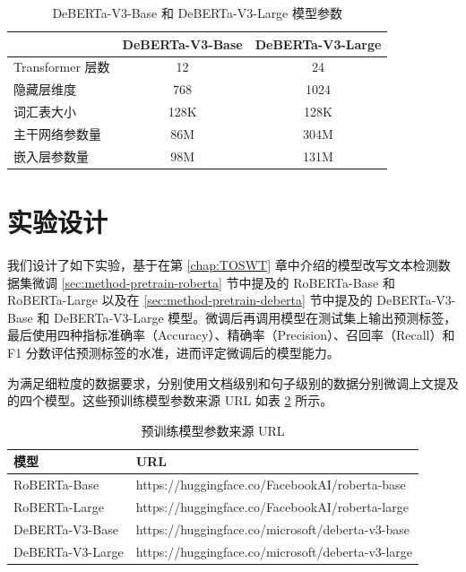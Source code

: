 \begin{table}[htbp]
\centering
\caption{DeBERTa-V3-Base 和 DeBERTa-V3-Large 模型参数} \label{tab:deberta-parameter}
\begin{tabular}{lcc}
\toprule
               & \multicolumn{1}{l}{\textbf{DeBERTa-V3-Base}} & \multicolumn{1}{l}{\textbf{DeBERTa-V3-Large}} \\ \midrule
Transformer 层数 & 12                                           & 24                                            \\
隐藏层维度          & 768                                          & 1024                                          \\
词汇表大小          & 128K                                         & 128K                                          \\
主干网络参数量        & 86M                                          & 304M                                          \\
嵌入层参数量         & 98M                                          & 131M                                \\ \bottomrule         
\end{tabular}
\end{table}

\section{实验设计}
\label{sec:method-experiment}

我们设计了如下实验，基于在第 \ref{chap:TOSWT} 章中介绍的模型改写文本检测数据集微调 \ref{sec:method-pretrain-roberta} 节中提及的 RoBERTa-Base 和 RoBERTa-Large 以及在 \ref{sec:method-pretrain-deberta} 节中提及的 DeBERTa-V3-Base 和 DeBERTa-V3-Large 模型。微调后再调用模型在测试集上输出预测标签，最后使用四种指标准确率（Accuracy）、精确率（Precision）、召回率（Recall）和 F1 分数评估预测标签的水准，进而评定微调后的模型能力。

为满足细粒度的数据要求，分别使用文档级别和句子级别的数据分别微调上文提及的四个模型。这些预训练模型参数来源 URL 如表 \ref{tab:method-pretrain_model_url} 所示。

\begin{table}[htbp]
\centering
\caption{预训练模型参数来源 URL} \label{tab:method-pretrain_model_url}
\begin{tabular}{ll}
\toprule
\textbf{模型}      & \textbf{URL}                                                                 \\ \midrule
RoBERTa-Base     & https://huggingface.co/FacebookAI/roberta-base    \\
RoBERTa-Large    & https://huggingface.co/FacebookAI/roberta-large   \\
DeBERTa-V3-Base  & https://huggingface.co/microsoft/deberta-v3-base  \\
DeBERTa-V3-Large & https://huggingface.co/microsoft/deberta-v3-large \\ \bottomrule
\end{tabular}
\end{table}

